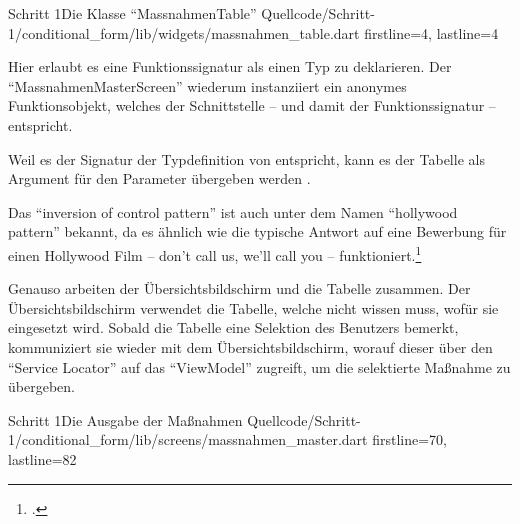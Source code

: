   \begin{alexlisting}{Schritt 1}{Die Klasse \enquote{MassnahmenTable}}
    {Quellcode/Schritt-1/conditional_form/lib/widgets/massnahmen_table.dart}
    {firstline=4, lastline=4}
    \label{lst:Schritt1TypedefOnSelectCallback}
  \end{alexlisting}
  
  Hier erlaubt es eine Funktionssignatur als einen Typ zu deklarieren.
  Der \enquote{MassnahmenMasterScreen} wiederum instanziiert ein anonymes Funktionsobjekt,
  welches der Schnittstelle -- und damit der Funktionssignatur -- entspricht.



  Weil es der Signatur der Typdefinition von  entspricht,
  kann es der Tabelle als Argument für den Parameter  übergeben werden . 
  

  



Das \enquote{inversion of control pattern} ist auch unter dem Namen \enquote{hollywood pattern} bekannt,
da es ähnlich wie die typische Antwort auf eine Bewerbung für einen Hollywood Film
-- don’t call us, we’ll call you --
funktioniert.\footcite[Vgl.][]{fowler2005InversionOfControl}

Genauso arbeiten der Übersichtsbildschirm und die Tabelle zusammen.
Der Übersichtsbildschirm verwendet die Tabelle, welche nicht wissen muss, wofür sie eingesetzt wird.
Sobald die Tabelle eine Selektion des Benutzers bemerkt, kommuniziert sie wieder mit dem Übersichtsbildschirm, worauf dieser über den \enquote{Service Locator} auf das \enquote{ViewModel} zugreift, um die selektierte Maßnahme zu übergeben.

\clearpage


\begin{alexlisting}{Schritt 1}{Die Ausgabe der Maßnahmen}
    {Quellcode/Schritt-1/conditional_form/lib/screens/massnahmen_master.dart}
    {firstline=70, lastline=82}
    \label{lst:Schritt1MassnahmenTableOnSelect}
  \end{alexlisting}

\vspace{21mm}

